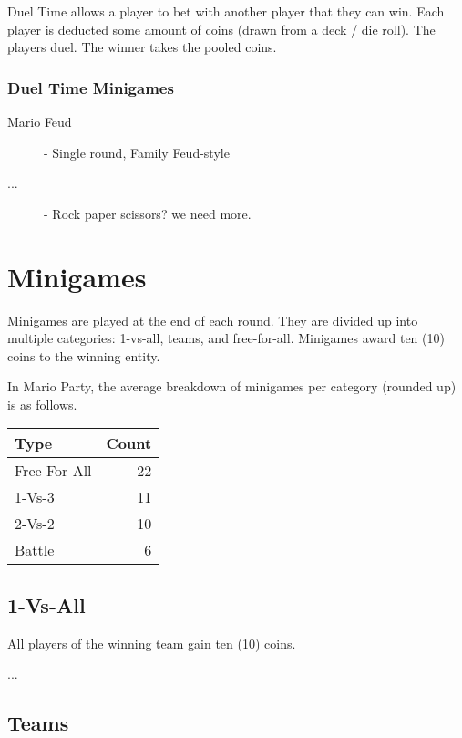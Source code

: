 \documentclass{article}
\begin{document}
Duel Time allows a player to bet with another player that they can win.
Each player is deducted some amount of coins (drawn from a deck / die roll).
The players duel.
The winner takes the pooled coins.

\subsubsection{Duel Time Minigames}

\begin{description}
\item[Mario Feud] - Single round, Family Feud-style
\item[...] - Rock paper scissors? we need more.
\end{description}

\section{Minigames}

Minigames are played at the end of each round.  They are divided up into multiple
categories: 1-vs-all, teams, and free-for-all.  Minigames award ten (10) coins
to the winning entity.


In Mario Party, the average breakdown of minigames per category (rounded up) is as follows.

\begin{tabular}{l|r}
\textbf{Type} & \textbf{Count} \\
\hline
Free-For-All & 22 \\
1-Vs-3 & 11 \\
2-Vs-2 & 10 \\
Battle & 6 \\
\end{tabular}

\subsection{1-Vs-All}

All players of the winning team gain ten (10) coins.

\begin{description}
\item[...]
\end{description}

\subsection{Teams}
\end{document}
